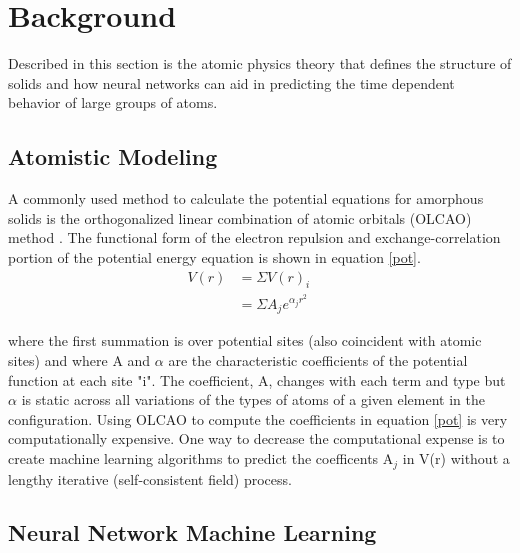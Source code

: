 \documentclass{article}
\begin{document}
\section{Background}

Described in this section is the atomic physics theory that defines the structure of solids and
how neural networks can aid in predicting the time dependent behavior of large groups of atoms.

\subsection{Atomistic Modeling}

A commonly used method to calculate the potential equations for amorphous solids is the 
orthogonalized linear combination of atomic orbitals (OLCAO) method \citep{Rulis}. The 
functional form of the electron repulsion and exchange-correlation portion of the potential energy
equation is shown in equation \ref{pot}.
\begin{align}
    V(r) & = \Sigma V(r)_{i} && \nonumber\\
         & = \Sigma A_{j} e^{\alpha_{j}r^{2}}
    \label{pot}
\end{align}

\noindent
where the first summation is over potential sites (also coincident with atomic sites) and
where A and $\alpha$ are the characteristic coefficients of the potential function at each site "i". 
The coefficient, A, changes with each term and type but $\alpha$ is static across all 
variations of the types of atoms of a given element in the configuration. Using OLCAO to compute 
the coefficients in equation \ref{pot} is very computationally expensive. One way to decrease the 
computational expense is to create machine learning algorithms to predict the coefficents A$_j{}$ in 
V(r) without a lengthy iterative (self-consistent field) process. 


\subsection{Neural Network Machine Learning}
\end{document}
